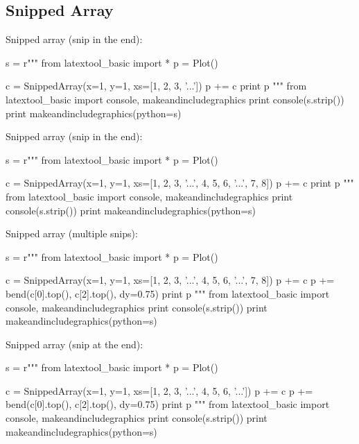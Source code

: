 \subsection{Snipped Array}


\begin{samepage}
Snipped array (snip in the end):
\begin{python}
s = r"""
from latextool_basic import *
p = Plot()

c = SnippedArray(x=1, y=1, xs=[1, 2, 3, '...'])
p += c
print p
"""
from latextool_basic import console, makeandincludegraphics
print console(s.strip())
print makeandincludegraphics(python=s)
\end{python}
\end{samepage}



\begin{samepage}
Snipped array (snip in the end):
\begin{python}
s = r"""
from latextool_basic import *
p = Plot()

c = SnippedArray(x=1, y=1, xs=[1, 2, 3, '...', 4, 5, 6, '...', 7, 8])
p += c
print p
"""
from latextool_basic import console, makeandincludegraphics
print console(s.strip())
print makeandincludegraphics(python=s)
\end{python}
\end{samepage}





\begin{samepage}
Snipped array (multiple snips):
\begin{python}
s = r"""
from latextool_basic import *
p = Plot()

c = SnippedArray(x=1, y=1, xs=[1, 2, 3, '...', 4, 5, 6, '...', 7, 8])
p += c
p += bend(c[0].top(), c[2].top(), dy=0.75)
print p
"""
from latextool_basic import console, makeandincludegraphics
print console(s.strip())
print makeandincludegraphics(python=s)
\end{python}
\end{samepage}



\begin{samepage}
Snipped array (snip at the end):
\begin{python}
s = r"""
from latextool_basic import *
p = Plot()

c = SnippedArray(x=1, y=1, xs=[1, 2, 3, '...', 4, 5, 6, '...'])
p += c
p += bend(c[0].top(), c[2].top(), dy=0.75)
print p
"""
from latextool_basic import console, makeandincludegraphics
print console(s.strip())
print makeandincludegraphics(python=s)
\end{python}
\end{samepage}


